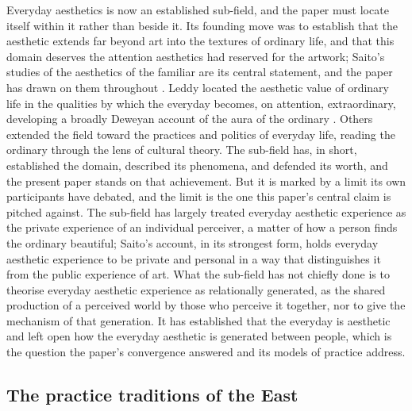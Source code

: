 Everyday aesthetics is now an established sub-field, and the paper must locate itself within it rather than beside it. Its founding move was to establish that the aesthetic extends far beyond art into the textures of ordinary life, and that this domain deserves the attention aesthetics had reserved for the artwork; Saito's studies of the aesthetics of the familiar are its central statement, and the paper has drawn on them throughout \parencite{saito2007,saito2017}. Leddy located the aesthetic value of ordinary life in the qualities by which the everyday becomes, on attention, extraordinary, developing a broadly Deweyan account of the aura of the ordinary \parencite{leddy2012}. Others extended the field toward the practices and politics of everyday life, reading the ordinary through the lens of cultural theory. The sub-field has, in short, established the domain, described its phenomena, and defended its worth, and the present paper stands on that achievement. But it is marked by a limit its own participants have debated, and the limit is the one this paper's central claim is pitched against. The sub-field has largely treated everyday aesthetic experience as the private experience of an individual perceiver, a matter of how a person finds the ordinary beautiful; Saito's account, in its strongest form, holds everyday aesthetic experience to be private and personal in a way that distinguishes it from the public experience of art. What the sub-field has not chiefly done is to theorise everyday aesthetic experience as relationally generated, as the shared production of a perceived world by those who perceive it together, nor to give the mechanism of that generation. It has established that the everyday is aesthetic and left open how the everyday aesthetic is generated between people, which is the question the paper's convergence answered and its models of practice address.

\subsection{The practice traditions of the East}
\label{p23:sub:field-east}

